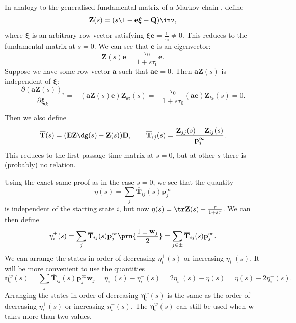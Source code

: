 \documentclass[12pt]{article}
\newcommand{\onev}{\mathbf{e}}
\newcommand{\onem}{\mathbf{E}}
\newcommand{\MM}{\mathbf{Q}}
\newcommand{\pr}{\mathbf{p}}
\newcommand{\eq}{\pr^\infty}
\newcommand{\fpt}{\mathbf{T}}
\newcommand{\fptb}{\overline{\fpt}}
\newcommand{\fund}{\mathbf{Z}}
\newcommand{\D}{\mathbf{D}}
\newcommand{\arow}{\boldsymbol{\xi}}
\newcommand{\etw}{\boldsymbol{\eta}^w}
\newcommand{\w}{\mathbf{w}}
\renewcommand{\pdiff}[2]{\frac{\partial #1}{\partial #2}}
\begin{document}
In analogy to the generalised fundamental matrix of a Markov chain \cite{Kemeny1981fund}, define
%
\begin{equation}\label{eq:lfund}
  \fund(s) = (s \I + \onev \arow -\MM)\inv,
\end{equation}
%
where $\arow$ is an arbitrary row vector satisfying $\arow \onev = \frac{1}{\tau_0} \neq 0$.
This reduces to the fundamental matrix at $s=0$.
We can see that $\onev$ is an eigenvector:
%
\begin{equation}\label{eq:lfundrowsum}
  \fund(s)\onev = \frac{\tau_0}{1+s\tau_0}\onev.
\end{equation}
%
Suppose we have some row vector $\mathbf{a}$ such that $\mathbf{a}\onev=0$.
Then $\mathbf{a}\fund(s)$ is independent of $\arow$:
%
\begin{equation}\label{eq:alfund}
  \pdiff{(\mathbf{a}\fund(s))_i}{\arow_k} = -(\mathbf{a}\fund(s)\onev) \fund_{ki}(s)
      = -\frac{\tau_0}{1+s\tau_0} (\mathbf{a}\onev) \fund_{ki}(s) = 0.
\end{equation}
%

Then we also define
%
\begin{equation}\label{eq:lfptb}
  \fptb(s) = (\onem \fund\dg(s)-\fund(s))\D,
  \qquad
  \fptb_{ij}(s) = \frac{\fund_{jj}(s)-\fund_{ij}(s)}{\eq_j}.
\end{equation}
%
This reduces to the first passage time matrix at $s=0$, but at other $s$ there is (probably) no relation.

Using the exact same proof as in the case $s=0$, we see that the quantity
%
\begin{equation}\label{eq:lkemeny}
  \eta(s) = \sum_j \fptb_{ij}(s)\eq_j
\end{equation}
%
is independent of the starting state $i$, but now $\eta(s) = \tr\fund(s) - \frac{\tau}{1+s\tau}$.
We can then define
%
\begin{equation}\label{eq:lpmixtime}
  \eta^{\pm}_i(s) = \sum_j \fptb_{ij}(s) \eq_j \prn{\frac{1 \pm \w_j}{2}} 
      =  \sum_{j\in \pm} \fptb_{ij}(s) \eq_j.
\end{equation}
%
We can arrange the states in order of decreasing $\eta^{+}_i(s)$ or increasing $\eta^{-}_i(s)$.
It will be more convenient to use the quantities
%
\begin{equation}\label{eq:lwpmixtime}
  \etw_i(s) = \sum_j \fptb_{ij}(s)\eq_j \w_j
    = \eta^+_i(s) - \eta^-_i(s) 
    = 2\eta^+_i(s) - \eta(s) 
    = \eta(s) - 2\eta^-_i(s) .
\end{equation}
%
Arranging the states in order of decreasing $\etw_i(s)$ is the same as the order of decreasing $\eta^{+}_i(s)$ or increasing $\eta^{-}_i(s)$.
The $\etw_i(s)$ can still be used when $\w$ takes more than two values.
\end{document}
